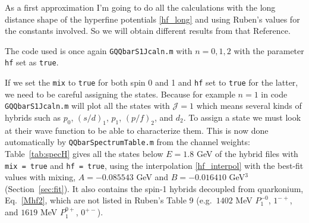 \documentclass[11pt, a4paper]{article}
\begin{document}
As a first approximation I'm going to do all the calculations with the long distance shape of the hyperfine potentials \eqref{hf_long} and using Ruben's values for the constants involved. So we will obtain different results from that Reference.

The code used is once again \texttt{GQQbarS1Jcaln.m} with $n=0,1,2$ with the parameter \texttt{hf} set as \texttt{true}.

If we set the \texttt{mix} to \texttt{true} for both spin 0 and 1 and \texttt{hf} set to \texttt{true} for the latter, we need to be careful assigning the states. Because for example $n=1$ in code \texttt{GQQbarS1Jcaln.m} will plot all the states with $\mathcal{J}=1$ which means several kinds of hybrids such as $p_0$, $(s/d)_1$, $p_1$, $(p/f)_2$, and $d_2$. To assign a state we must look at their wave function to be able to characterize them. This is now done automatically by \texttt{QQbarSpectrumTable.m} from the channel weights: Table~\ref{tab:specH} gives all the states below $E=1.8$ GeV of the hybrid files with \texttt{mix = true} and \texttt{hf = true}, using the interpolation \eqref{hf_interpol} with the best-fit values with mixing, $A=-0.085543$ GeV and $B=-0.016410$ GeV$^3$ (Section~\ref{sec:fit}). It also contains the spin-1 hybrids decoupled from quarkonium, Eq.~\eqref{Mhf2}, which are not listed in Ruben's Table 9 (e.g.\ $1402$ MeV $P_1^{-0}$, $1^{-+}$, and $1619$ MeV $P_1^{0+}$, $0^{+-}$).
\end{document}
